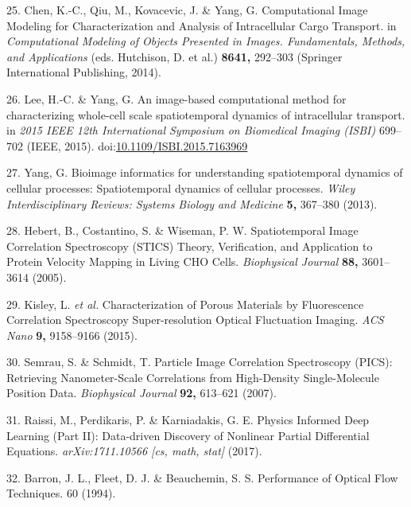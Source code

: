 \documentclass{Dissertate}
\begin{document}
\leavevmode\hypertarget{ref-hutchison_computational_2014}{}%
25. Chen, K.-C., Qiu, M., Kovacevic, J. \& Yang, G. Computational Image
Modeling for Characterization and Analysis of Intracellular Cargo
Transport. in \emph{Computational Modeling of Objects Presented in
Images. Fundamentals, Methods, and Applications} (eds. Hutchison, D. et
al.) \textbf{8641,} 292--303 (Springer International Publishing, 2014).

\leavevmode\hypertarget{ref-lee_image-based_2015}{}%
26. Lee, H.-C. \& Yang, G. An image-based computational method for
characterizing whole-cell scale spatiotemporal dynamics of intracellular
transport. in \emph{2015 IEEE 12th International Symposium on Biomedical
Imaging (ISBI)} 699--702 (IEEE, 2015).
doi:\href{https://doi.org/10.1109/ISBI.2015.7163969}{10.1109/ISBI.2015.7163969}

\leavevmode\hypertarget{ref-yang_bioimage_2013}{}%
27. Yang, G. Bioimage informatics for understanding spatiotemporal
dynamics of cellular processes: Spatiotemporal dynamics of cellular
processes. \emph{Wiley Interdisciplinary Reviews: Systems Biology and
Medicine} \textbf{5,} 367--380 (2013).

\leavevmode\hypertarget{ref-hebert_spatiotemporal_2005}{}%
28. Hebert, B., Costantino, S. \& Wiseman, P. W. Spatiotemporal Image
Correlation Spectroscopy (STICS) Theory, Verification, and Application
to Protein Velocity Mapping in Living CHO Cells. \emph{Biophysical
Journal} \textbf{88,} 3601--3614 (2005).

\leavevmode\hypertarget{ref-kisley_characterization_2015}{}%
29. Kisley, L. \emph{et al.} Characterization of Porous Materials by
Fluorescence Correlation Spectroscopy Super-resolution Optical
Fluctuation Imaging. \emph{ACS Nano} \textbf{9,} 9158--9166 (2015).

\leavevmode\hypertarget{ref-semrau_particle_2007}{}%
30. Semrau, S. \& Schmidt, T. Particle Image Correlation Spectroscopy
(PICS): Retrieving Nanometer-Scale Correlations from High-Density
Single-Molecule Position Data. \emph{Biophysical Journal} \textbf{92,}
613--621 (2007).

\leavevmode\hypertarget{ref-raissi_physics_2017}{}%
31. Raissi, M., Perdikaris, P. \& Karniadakis, G. E. Physics Informed
Deep Learning (Part II): Data-driven Discovery of Nonlinear Partial
Differential Equations. \emph{arXiv:1711.10566 {[}cs, math, stat{]}}
(2017).

\leavevmode\hypertarget{ref-barron_performance_1994}{}%
32. Barron, J. L., Fleet, D. J. \& Beauchemin, S. S. Performance of
Optical Flow Techniques. 60 (1994).
\end{document}
